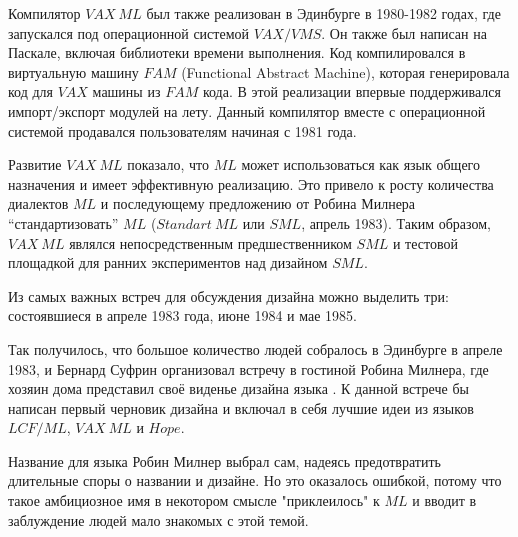 \documentclass[14pt]{matmex-diploma-custom}
\begin{document}
Компилятор $V\!AX\ ML$ был также реализован в Эдинбурге в 1980-1982 годах, где запускался под операционной системой $V\!AX/V\!MS$. Он также был написан на Паскале, включая библиотеки времени выполнения. Код компилировался в  виртуальную машину $FAM$ (Functional Abstract Machine), которая генерировала код для $V\!AX$ машины из $F\!AM$ кода. В этой реализации впервые поддерживался импорт/экспорт модулей на лету. Данный компилятор вместе с операционной системой продавался пользователям начиная с 1981 года.

Развитие $V\!AX\ ML$ показало, что $M\!L$ может использоваться как язык общего назначения и имеет эффективную реализацию. Это привело к росту количества диалектов $M\!L$ и последующему предложению от Робина Милнера “стандартизовать” $M\!L$ ($Standart\ M\!L$ или $SM\!L$, апрель 1983). Таким образом,  $V\!AX\ M\!L$ являлся непосредственным предшественником $SM\!L$ и тестовой площадкой для ранних экспериментов над дизайном $SM\!L$.

Из самых важных встреч для обсуждения дизайна можно выделить три: состоявшиеся в апреле 1983 года, июне 1984 и мае 1985. 

Так получилось, что большое количество людей собралось в Эдинбурге в апреле 1983, и Бернард Суфрин организовал встречу в гостиной Робина Милнера, где хозяин дома представил своё виденье дизайна языка \cite{milner2}. К данной встрече бы написан первый черновик дизайна и включал в себя лучшие идеи из языков $LCF/M\!L$, $V\!AX\ M\!L$ и $Hope$. 


Название для языка Робин Милнер выбрал сам, надеясь предотвратить длительные споры о названии и дизайне. Но это оказалось ошибкой, потому что такое амбициозное имя в некотором смысле "приклеилось" к $M\!L$ и вводит в заблуждение людей мало знакомых с этой темой.
\end{document}

